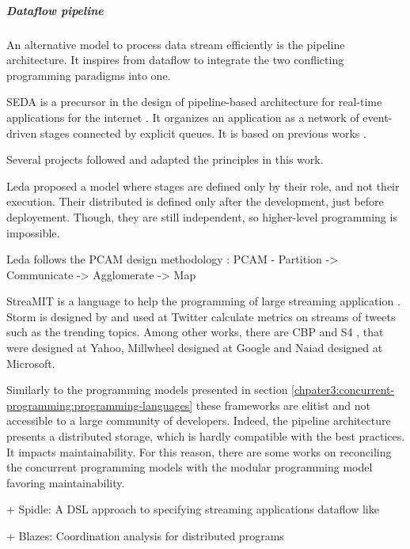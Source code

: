 \subparagraph{Dataflow pipeline} \label{chapter3:software-efficiency:dataflow-pipeline}

An alternative model to process data stream efficiently is the pipeline architecture.
It inspires from dataflow to integrate the two conflicting programming paradigms into one.

SEDA is a precursor in the design of pipeline-based architecture for real-time applications for the internet \cite{Welsh2001}.
It organizes an application as a network of event-driven stages connected by explicit queues.
It is based on previous works \cite{Gribble2001,Pai1999}.

Several projects followed and adapted the principles in this work.

Leda \cite{Salmito2013,Salmito2014} proposed a model where stages are defined only by their role, and not their execution.
Their distributed is defined only after the development, just before deployement.
Though, they are still independent, so higher-level programming is impossible.

Leda follows the PCAM design methodology : PCAM \cite{Foster1995} - Partition -> Communicate -> Agglomerate -> Map


StreaMIT is a language to help the programming of large streaming application \cite{Thies2002}.
Storm \cite{Toshniwal2014} is designed by and used at Twitter calculate metrics on streams of tweets such as the trending topics.
Among other works, there are CBP \cite{Logothetis2010} and S4 \cite{Neumeyer2010}, that were designed at Yahoo, Millwheel \cite{Akidau2013} designed at Google and Naiad \cite{Murray2013} designed at Microsoft.

Similarly to the programming models presented in section \ref{chpater3:concurrent-programming:programming-languages} these frameworks are elitist and not accessible to a large community of developers.
Indeed, the pipeline architecture presents a distributed storage, which is hardly compatible with the best practices.
It impacts maintainability.
For this reason, there are some works on reconciling the concurrent programming models with the modular programming model favoring maintainability.

+ Spidle: A DSL approach to specifying streaming applications dataflow like


+ Blazes: Coordination analysis for distributed programs \cite{Alvaro2014}



